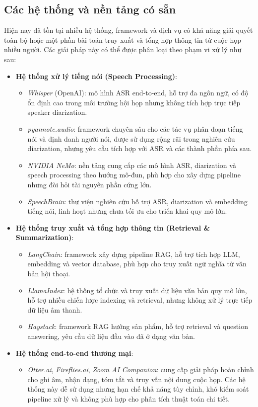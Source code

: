 \subsection{Các hệ thống và nền tảng có sẵn}

Hiện nay đã tồn tại nhiều hệ thống, framework và dịch vụ có khả năng giải quyết toàn bộ hoặc một phần bài toán truy xuất và tổng hợp thông tin từ cuộc họp nhiều người. Các giải pháp này có thể được phân loại theo phạm vi xử lý như sau:

\begin{itemize}[label={}]
    \item \textbf{Hệ thống xử lý tiếng nói (Speech Processing)}:
    \begin{itemize}
        \item \textit{Whisper} (OpenAI): mô hình ASR end-to-end, hỗ trợ đa ngôn ngữ, có độ ổn định cao trong môi trường hội họp nhưng không tích hợp trực tiếp speaker diarization.
        \item \textit{pyannote.audio}: framework chuyên sâu cho các tác vụ phân đoạn tiếng nói và định danh người nói, được sử dụng rộng rãi trong nghiên cứu diarization, nhưng yêu cầu tích hợp với ASR và các thành phần phía sau.
        \item \textit{NVIDIA NeMo}: nền tảng cung cấp các mô hình ASR, diarization và speech processing theo hướng mô-đun, phù hợp cho xây dựng pipeline nhưng đòi hỏi tài nguyên phần cứng lớn.
        \item \textit{SpeechBrain}: thư viện nghiên cứu hỗ trợ ASR, diarization và embedding tiếng nói, linh hoạt nhưng chưa tối ưu cho triển khai quy mô lớn.
    \end{itemize}

    \item \textbf{Hệ thống truy xuất và tổng hợp thông tin (Retrieval \& Summarization)}:
    \begin{itemize}
        \item \textit{LangChain}: framework xây dựng pipeline RAG, hỗ trợ tích hợp LLM, embedding và vector database, phù hợp cho truy xuất ngữ nghĩa từ văn bản hội thoại.
        \item \textit{LlamaIndex}: hệ thống tổ chức và truy xuất dữ liệu văn bản quy mô lớn, hỗ trợ nhiều chiến lược indexing và retrieval, nhưng không xử lý trực tiếp dữ liệu âm thanh.
        \item \textit{Haystack}: framework RAG hướng sản phẩm, hỗ trợ retrieval và question answering, yêu cầu dữ liệu đầu vào đã ở dạng văn bản.
    \end{itemize}

    \item \textbf{Hệ thống end-to-end thương mại}:
    \begin{itemize}
        \item \textit{Otter.ai}, \textit{Fireflies.ai}, \textit{Zoom AI Companion}: cung cấp giải pháp hoàn chỉnh cho ghi âm, nhận dạng, tóm tắt và truy vấn nội dung cuộc họp. Các hệ thống này dễ sử dụng nhưng hạn chế khả năng tùy chỉnh, khó kiểm soát pipeline xử lý và không phù hợp cho phân tích thuật toán chi tiết.
    \end{itemize}
\end{itemize}

